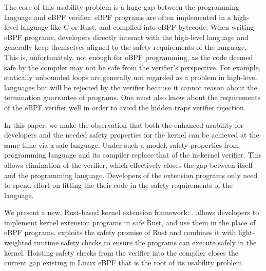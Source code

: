 
The core of this usability problem is a huge gap between the programming
    language and eBPF verifier.
eBPF programs are often implemented in a high-level language like C or Rust,
    and compiled into eBPF bytecode.
When writing eBPF programs, developers directly interact with the high-level
    language and generally keep themselves aligned to the safety requirements
    of the language.
This is, unfortunately, not enough for eBPF programming, as the code deemed
    safe by the compiler may not be safe from the verifier's perspective.
For example, statically unbounded loops are generally not regarded as a problem
    in high-level languages but will be rejected by the verifier because it
    cannot reason about the termination guarrantee of programs.
One must also know about the requirements of the eBPF verifier well in order to
    avoid the hidden traps verifier rejection.


In this paper, we make the observation that both the enhanced usability for
    developers and the needed safety properties for the kernel can be achieved
    at the same time via a safe language.
Under such a model, safety properties from programming language and its
    compiler replace that of the in-kernel verifier.
This allows elimination of the verifier, which effectively closes the gap
    between itself and the programming language.
Developers of the extension programs only need to spend effort on fitting the
    their code in the safety requirements of the language.

We present a new, Rust-based kernel extension framework: \projname{}.
\projname{} allows developers to implement kernel extension programs in safe
    Rust, and use them in the place of eBPF programs.
\projname{} exploits the safety promise of Rust and combines it with
    light-weighted runtime safety checks to ensure the programs can execute
    safely in the kernel.
Hoisting safety checks from the verifier into the compiler closes the current
    gap existing in Linux eBPF that is the root of its usability problem.

